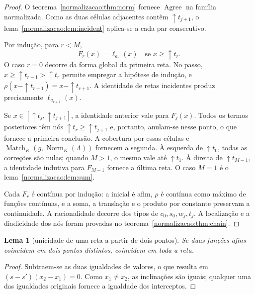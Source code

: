 \documentclass[12pt,a4paper]{article}
\theoremstyle{preciso}
\newtheorem{lema}[teorema]{Lema}
\theoremstyle{definition}
\newcommand{\Norm}{\operatorname{Norm}}
\newcommand{\Match}{\operatorname{Match}}
\newcommand{\Agree}{\operatorname{Agree}}
\theoremstyle{preciso}
\theoremstyle{preciso}
\theoremstyle{preciso}
\theoremstyle{preciso}
\theoremstyle{definition}
\theoremstyle{preciso}
\theoremstyle{definition}
\theoremstyle{preciso}
\theoremstyle{preciso}
\theoremstyle{definition}
\begin{document}
\begin{proof}
O teorema~\ref{normalizacao:thm:norm} fornece $\Agree$ na família normalizada.
Como as duas células adjacentes contêm $\uparrow t_{j+1}$,
o lema~\ref{normalizacao:lem:incident} aplica-se a cada par consecutivo.

Por indução, para $r<M$,
\[
 F_r(x)=\ell_{a_r}(x)\quad\text{se }x\ge\uparrow t_r.
\]
O caso $r=0$ decorre da forma global da primeira reta.
No passo, $x\ge\uparrow t_{r+1}>\uparrow t_r$ permite empregar a
hipótese de indução, e
$\rho(x-\uparrow t_{r+1})=x-\uparrow t_{r+1}$. A identidade
de retas incidentes produz precisamente $\ell_{a_{r+1}}(x)$.

Se $x\in[\uparrow t_j,\uparrow t_{j+1}]$, a identidade anterior
vale para $F_j(x)$. Todos os termos posteriores têm nós
$\uparrow t_r\ge\uparrow t_{j+1}$ e, portanto, anulam-se nesse
ponto, o que fornece a primeira conclusão. A cobertura por essas células
e $\Match_K(g,\Norm_K(\Lambda))$ fornecem a segunda.
À esquerda de $\uparrow t_0$, todas as correções são nulas; quando
$M>1$, o mesmo vale até $\uparrow t_1$. À direita de
$\uparrow t_{M-1}$, a identidade indutiva para $F_{M-1}$ fornece a
última reta. O caso $M=1$ é o lema~\ref{normalizacao:lem:sum}.

Cada $F_r$ é contínua por indução: a inicial é afim, $\rho$ é
contínua como máximo de funções contínuas, e a soma, a translação e o
produto por constante preservam a continuidade. A racionalidade
decorre dos tipos de $c_0,s_0,w_j,t_j$. A localização e a diadicidade
dos nós foram provadas no teorema~\ref{normalizacao:thm:chain}.
\end{proof}

\begin{lema}[unicidade de uma reta a partir de dois pontos]\label{map:normalizacao:8.5}\label{normalizacao:lem:two_points}
Se duas funções afins coincidem em dois pontos distintos, coincidem
em toda a reta.
\end{lema}
\begin{proof}
Subtraem-se as duas igualdades de valores, o que resulta em
$(s-s')(x_2-x_1)=0$. Como $x_1\ne x_2$, as inclinações são
iguais; qualquer uma das igualdades originais fornece a igualdade dos
interceptos.
\end{proof}
\end{document}

